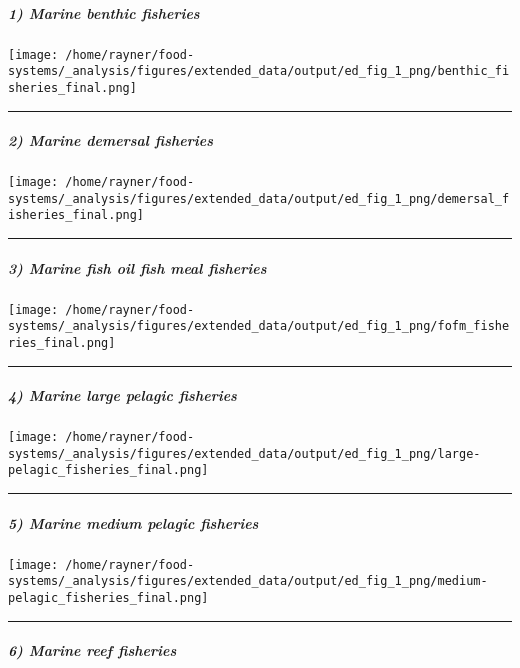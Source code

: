 \documentclass[
]{article}
\begin{document}
\hypertarget{marine-benthic-fisheries}{%
\subparagraph{1) Marine benthic
fisheries}\label{marine-benthic-fisheries}}

\texttt{[image: /home/rayner/food-systems/\_analysis/figures/extended\_data/output/ed\_fig\_1\_png/benthic\_fisheries\_final.png]}

\begin{center}\rule{0.5\linewidth}{0.5pt}\end{center}

\hypertarget{marine-demersal-fisheries}{%
\subparagraph{2) Marine demersal
fisheries}\label{marine-demersal-fisheries}}

\texttt{[image: /home/rayner/food-systems/\_analysis/figures/extended\_data/output/ed\_fig\_1\_png/demersal\_fisheries\_final.png]}

\begin{center}\rule{0.5\linewidth}{0.5pt}\end{center}

\hypertarget{marine-fish-oil-fish-meal-fisheries}{%
\subparagraph{3) Marine fish oil fish meal
fisheries}\label{marine-fish-oil-fish-meal-fisheries}}

\texttt{[image: /home/rayner/food-systems/\_analysis/figures/extended\_data/output/ed\_fig\_1\_png/fofm\_fisheries\_final.png]}

\begin{center}\rule{0.5\linewidth}{0.5pt}\end{center}

\hypertarget{marine-large-pelagic-fisheries}{%
\subparagraph{4) Marine large pelagic
fisheries}\label{marine-large-pelagic-fisheries}}

\texttt{[image: /home/rayner/food-systems/\_analysis/figures/extended\_data/output/ed\_fig\_1\_png/large-pelagic\_fisheries\_final.png]}

\begin{center}\rule{0.5\linewidth}{0.5pt}\end{center}

\hypertarget{marine-medium-pelagic-fisheries}{%
\subparagraph{5) Marine medium pelagic
fisheries}\label{marine-medium-pelagic-fisheries}}

\texttt{[image: /home/rayner/food-systems/\_analysis/figures/extended\_data/output/ed\_fig\_1\_png/medium-pelagic\_fisheries\_final.png]}

\begin{center}\rule{0.5\linewidth}{0.5pt}\end{center}

\hypertarget{marine-reef-fisheries}{%
\subparagraph{6) Marine reef fisheries}\label{marine-reef-fisheries}}
\end{document}
